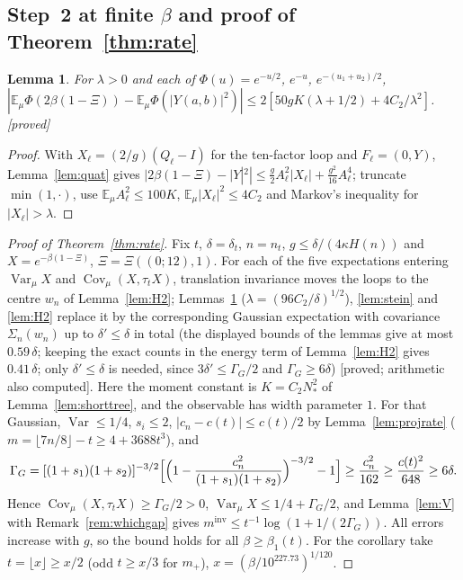 \documentclass[11pt,a4paper]{article}
\theoremstyle{plain}
\newtheorem{lemma}[theorem]{Lemma}
\theoremstyle{definition}
\theoremstyle{remark}
\numberwithin{equation}{section}
\newcommand{\E}{\mathbb{E}}
\newcommand{\Var}{\operatorname{Var}}
\newcommand{\Cov}{\operatorname{Cov}}
\newcommand{\st}[1]{\textsf{[#1]}}
\begin{document}
\subsection{Step~2 at finite $\beta$ and proof of Theorem~\ref{thm:rate}}
\begin{lemma}\label{lem:bch2}
For $\lambda>0$ and each of $\Phi(u)=e^{-u/2}$, $e^{-u}$, $e^{-(u_1+u_2)/2}$,
$|\E_\mu\Phi(2\beta(1-\Xi))-\E_\mu\Phi(|Y(a,b)|^2)|\le2[50gK(\lambda+1/2)+4C_2/\lambda^2]$. \st{proved}
\end{lemma}
\begin{proof}
With $X_\ell=(2/g)(Q_\ell-I)$ for the ten-factor loop and $F_\ell=(0,Y)$, Lemma~\ref{lem:quat} gives
$|2\beta(1-\Xi)-|Y|^2|\le\frac g2A_\ell^2|X_\ell|+\frac{g^2}{16}A_\ell^4$; truncate $\min(1,\cdot)$, use $\E_\mu A_\ell^2\le100K$,
$\E_\mu|X_\ell|^2\le4C_2$ and Markov's inequality for $|X_\ell|>\lambda$.
\end{proof}
\begin{proof}[Proof of Theorem~\ref{thm:rate}]
Fix $t$, $\delta=\delta_t$, $n=n_t$, $g\le\delta/(4\kappa H(n))$ and $X=e^{-\beta(1-\Xi)}$, $\Xi=\Xi((0;12),1)$. For each of the five
expectations entering $\Var_\mu X$ and $\Cov_\mu(X,\tau_tX)$, translation invariance moves the loops to the centre $w_n$ of
Lemma~\ref{lem:H2}; Lemmas~\ref{lem:bch2} ($\lambda=(96C_2/\delta)^{1/2}$), \ref{lem:stein} and \ref{lem:H2} replace it by the corresponding
Gaussian expectation with covariance $\Sigma_n(w_n)$ up to $\delta'\le\delta$ in total (the displayed bounds of the lemmas give at most $0.59\,\delta$; keeping the exact counts in the energy term of Lemma~\ref{lem:H2} gives $0.41\,\delta$; only $\delta'\le\delta$ is needed, since $3\delta'\le\Gamma_G/2$ and $\Gamma_G\ge6\delta$) \st{proved; arithmetic also computed}. Here the moment constant is $K=C_2N_*^2$ of Lemma~\ref{lem:shorttree}, and the observable has width parameter $1$. For that Gaussian,
$\Var\le1/4$, $s_i\le2$, $|c_n-c(t)|\le c(t)/2$ by Lemma~\ref{lem:projrate} ($m=\lfloor7n/8\rfloor-t\ge4+3688t^3$), and
\[
\Gamma_G=[(1+s_1)(1+s_2)]^{-3/2}\Bigl[\Bigl(1-\frac{c_n^2}{(1+s_1)(1+s_2)}\Bigr)^{-3/2}-1\Bigr]\ge\frac{c_n^2}{162}\ge\frac{c(t)^2}{648}\ge6\delta .
\]
Hence $\Cov_\mu(X,\tau_tX)\ge\Gamma_G/2>0$, $\Var_\mu X\le1/4+\Gamma_G/2$, and Lemma~\ref{lem:V} with Remark~\ref{rem:whichgap} gives
$m^{\mathrm{inv}}\le t^{-1}\log(1+1/(2\Gamma_G))$. All errors increase with $g$, so the bound holds for all $\beta\ge\beta_1(t)$. For the
corollary take $t=\lfloor x\rfloor\ge x/2$ (odd $t\ge x/3$ for $m_+$), $x=(\beta/10^{227.73})^{1/120}$.
\end{proof}
\end{document}
